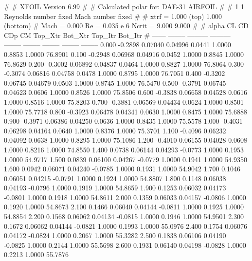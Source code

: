 #  
#       XFOIL         Version 6.99
#  
# Calculated polar for: DAE-31 AIRFOIL                                  
#  
# 1 1 Reynolds number fixed          Mach number fixed         
#  
# xtrf =   1.000 (top)        1.000 (bottom)  
# Mach =   0.000     Re =     0.035 e 6     Ncrit =   9.000  9.000
#  
#   alpha    CL        CD       CDp       CM     Top_Xtr  Bot_Xtr  Top_Itr  Bot_Itr
#  ------ -------- --------- --------- -------- -------- -------- -------- --------
   0.000  -0.2898   0.07040   0.04996   0.0441   1.0000   0.8853   1.0000  76.8901
   0.100  -0.2948   0.06968   0.04916   0.0452   1.0000   0.8845   1.0000  76.8629
   0.200  -0.3002   0.06892   0.04837   0.0464   1.0000   0.8827   1.0000  76.8064
   0.300  -0.3074   0.06816   0.04758   0.0478   1.0000   0.8795   1.0000  76.7051
   0.400  -0.3202   0.06745   0.04679   0.0503   1.0000   0.8745   1.0000  76.5470
   0.500  -0.3791   0.06745   0.04623   0.0606   1.0000   0.8526   1.0000  75.8506
   0.600  -0.3838   0.06658   0.04528   0.0616   1.0000   0.8516   1.0000  75.8203
   0.700  -0.3881   0.06569   0.04434   0.0624   1.0000   0.8501   1.0000  75.7718
   0.800  -0.3923   0.06478   0.04341   0.0630   1.0000   0.8475   1.0000  75.6888
   0.900  -0.3971   0.06386   0.04250   0.0636   1.0000   0.8435   1.0000  75.5578
   1.000  -0.4031   0.06298   0.04164   0.0640   1.0000   0.8376   1.0000  75.3701
   1.100  -0.4096   0.06232   0.04092   0.0638   1.0000   0.8295   1.0000  75.1086
   1.200  -0.4010   0.06155   0.04028   0.0608   1.0000   0.8216   1.0000  74.8550
   1.400   0.0738   0.06144   0.04293  -0.0773   1.0000   0.1953   1.0000  54.9717
   1.500   0.0839   0.06100   0.04267  -0.0779   1.0000   0.1941   1.0000  54.9350
   1.600   0.0942   0.06071   0.04240  -0.0785   1.0000   0.1931   1.0000  54.9042
   1.700   0.1046   0.06051   0.04215  -0.0791   1.0000   0.1924   1.0000  54.8807
   1.800   0.1148   0.06038   0.04193  -0.0796   1.0000   0.1919   1.0000  54.8659
   1.900   0.1253   0.06032   0.04173  -0.0801   1.0000   0.1918   1.0000  54.8611
   2.000   0.1359   0.06033   0.04157  -0.0806   1.0000   0.1920   1.0000  54.8673
   2.100   0.1466   0.06040   0.04144  -0.0811   1.0000   0.1925   1.0000  54.8854
   2.200   0.1568   0.06062   0.04134  -0.0815   1.0000   0.1946   1.0000  54.9501
   2.300   0.1672   0.06062   0.04144  -0.0821   1.0000   0.1993   1.0000  55.0976
   2.400   0.1754   0.06076   0.04172  -0.0824   1.0000   0.2067   1.0000  55.3282
   2.500   0.1838   0.06106   0.04190  -0.0825   1.0000   0.2144   1.0000  55.5698
   2.600   0.1931   0.06140   0.04198  -0.0828   1.0000   0.2213   1.0000  55.7876

